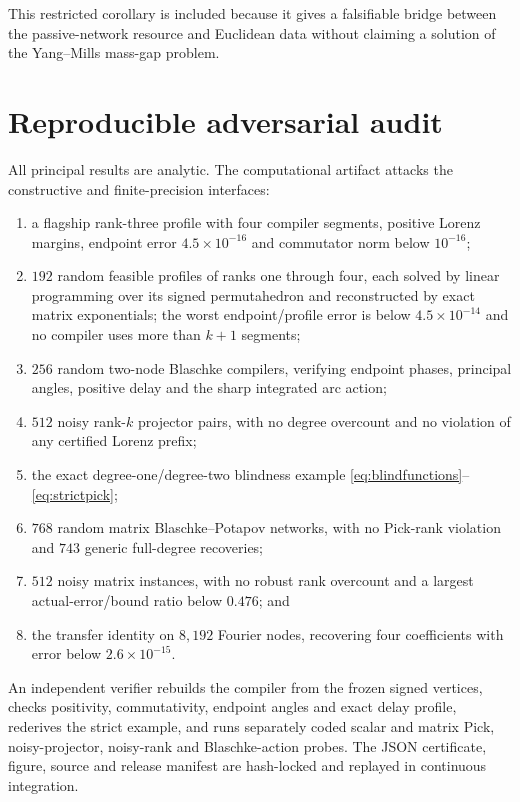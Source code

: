 \documentclass[11pt]{article}
\theoremstyle{definition}
\theoremstyle{remark}
\begin{document}
This restricted corollary is included because it gives a falsifiable bridge
between the passive-network resource and Euclidean data without claiming a
solution of the Yang--Mills mass-gap problem.

\section{Reproducible adversarial audit}

All principal results are analytic.  The computational artifact attacks the
constructive and finite-precision interfaces:
\begin{enumerate}
 \item a flagship rank-three profile with four compiler segments, positive
 Lorenz margins, endpoint error $4.5\times10^{-16}$ and commutator norm below
 $10^{-16}$;
 \item $192$ random feasible profiles of ranks one through four, each solved
 by linear programming over its signed permutahedron and reconstructed by
 exact matrix exponentials; the worst endpoint/profile error is below
 $4.5\times10^{-14}$ and no compiler uses more than $k+1$ segments;
 \item $256$ random two-node Blaschke compilers, verifying endpoint phases,
 principal angles, positive delay and the sharp integrated arc action;
 \item $512$ noisy rank-$k$ projector pairs, with no degree overcount and no
 violation of any certified Lorenz prefix;
 \item the exact degree-one/degree-two blindness example
 \eqref{eq:blindfunctions}--\eqref{eq:strictpick};
 \item $768$ random matrix Blaschke--Potapov networks, with no Pick-rank
 violation and $743$ generic full-degree recoveries;
 \item $512$ noisy matrix instances, with no robust rank overcount and a
 largest actual-error/bound ratio below $0.476$; and
 \item the transfer identity on $8{,}192$ Fourier nodes, recovering four
 coefficients with error below $2.6\times10^{-15}$.
\end{enumerate}
An independent verifier rebuilds the compiler from the frozen signed vertices,
checks positivity, commutativity, endpoint angles and exact delay profile,
rederives the strict example, and runs separately coded scalar and matrix Pick,
noisy-projector, noisy-rank and Blaschke-action probes.  The JSON certificate,
figure, source and release manifest are hash-locked and replayed in continuous
integration.
\end{document}
